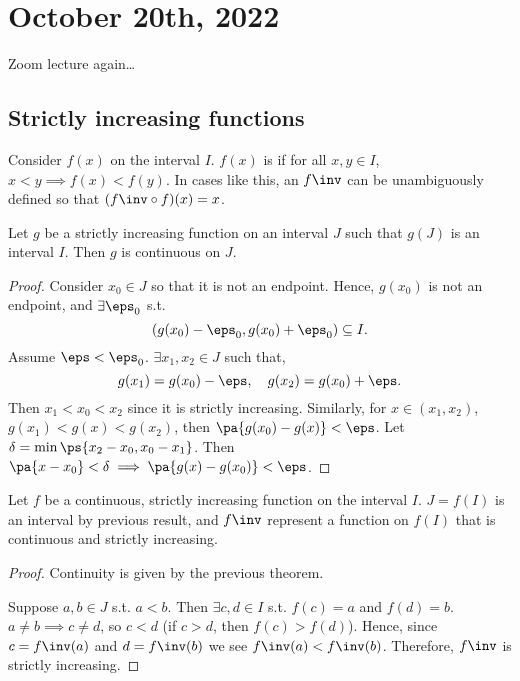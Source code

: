 \documentclass[11pt]{scrartcl}
\numberwithin{equation}{section}
\begin{document}
\section{October 20th, 2022}
Zoom lecture again\dots
\subsection{Strictly increasing functions}
\begin{definition}
    Consider $f(x)$ on the interval $I$. $f(x)$ is  if for all $x,y\in I$, $x<y \implies f(x)<f(y)$.
    In cases like this, an  $f\inv$ can 
    be unambiguously defined so that $(f\inv\circ f)(x) = x$.
\end{definition}

\begin{theorem}
    Let $g$ be a strictly increasing function on an interval $J$ 
    such that $g(J)$ is an interval $I$. Then $g$ is continuous on $J$.
\end{theorem}

\begin{proof}
    Consider $x_0\in J$ so that it is not 
    an endpoint. Hence, $g(x_0)$ is not an endpoint, and $\exists \eps_0$
    s.t. \[ (g(x_0)-\eps_0, g(x_0) +\eps_0) \subseteq I.\]
    Assume $\eps<\eps_0$. $\exists x_1,x_2\in J$ such that,
    \[
        g(x_1)=g(x_0) - \eps, \quad g(x_2)=g(x_0) + \eps.
    \]
    Then $x_1<x_0<x_2$ since it is strictly 
    increasing. Similarly, for $x\in(x_1,x_2)$, $g(x_1) < g(x)  < g(x_2)$,
    then $\pa{g(x_0)-g(x)}<\eps$. Let $\delta = \min\ps{x_2-x_0, x_0-x_1}$.
    Then $\pa{x-x_0}<\delta \implies \pa{g(x)-g(x_0)}<\eps$.
\end{proof}

\begin{theorem}
    Let $f$ be a continuous, strictly increasing function on the 
    interval $I$. $J=f(I)$ is an interval by previous result,
    and $f\inv$ represent a function on $f(I)$ that is continuous 
    and strictly increasing.
\end{theorem}

\begin{proof}
    Continuity is given by the previous theorem.

    Suppose $a,b\in J$ s.t. $a<b$. Then $\exists c,d \in I$ s.t. 
    $f(c)=a$ and $f(d)=b$. $a\neq b\implies c\neq d$, so 
    $c<d$ (if $c>d$, then $f(c)>f(d)$). Hence, since $c=f\inv(a)$
    and $d=f\inv(b)$ we see $f\inv(a)<f\inv(b)$.
    Therefore, $f\inv$ is strictly increasing.
\end{proof}
\end{document}
